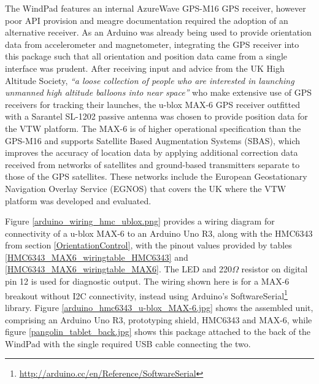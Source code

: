 \newcommand{\softwareserialFootnote}{\footnote{\url{http://arduino.cc/en/Reference/SoftwareSerial}}}

\newcommand{\maxProtocolFootnote}{\footnote{\url{https://u-blox.com/images/downloads/Product_Docs/u-blox6_ReceiverDescriptionProtocolSpec_(GPS.G6-SW-10018).pdf}}}

\newcommand{\tinygpsFootnote}{\footnote{\url{http://arduiniana.org/libraries/tinygps/}}}


The WindPad features an internal AzureWave GPS-M16 GPS receiver\azurewaveFootnote{}, however poor API provision and meagre documentation required the adoption of an alternative receiver. As an Arduino was already being used to provide orientation data from accelerometer and magnetometer, integrating the GPS receiver into this package such that all orientation and position data came from a single interface was prudent. After receiving input and advice from the UK High Altitude Society, \textit{``a loose collection of people who are interested in launching unmanned high altitude balloons into near space''}\habFootnote{} who make extensive use of GPS receivers for tracking their launches, the u-blox MAX-6\ubloxFootnote{} GPS receiver outfitted with a Sarantel SL-1202\sarantelFootnote{} passive antenna was chosen to provide position data for the VTW platform. The MAX-6 is of higher operational specification than the GPS-M16 and supports Satellite Based Augmentation Systems (SBAS), which improves the accuracy of location data by applying additional correction data received from networks of satellites and ground-based transmitters separate to those of the GPS satellites. These networks include the European Geostationary Navigation Overlay Service (EGNOS) that covers the UK where the VTW platform was developed and evaluated.

Figure \ref{arduino_wiring_hmc_ublox.png} provides a wiring diagram for connectivity of a u-blox MAX-6 to an Arduino Uno R3, along with the HMC6343 from section \ref{OrientationControl}, with the pinout values provided by tables \ref{HMC6343_MAX6_wiringtable_HMC6343} and \ref{HMC6343_MAX6_wiringtable_MAX6}. The LED and 220$\Omega$ resistor on digital pin 12 is used for diagnostic output. The wiring shown here is for a MAX-6 breakout without I2C connectivity, instead using Arduino's SoftwareSerial\softwareserialFootnote{} library. Figure \ref{arduino_hmc6343_u-blox_MAX-6.jpg} shows the assembled unit, comprising an Arduino Uno R3, prototyping shield, HMC6343 and MAX-6, while figure \ref{pangolin_tablet_back.jpg} shows this package attached to the back of the WindPad with the single required USB cable connecting the two.

